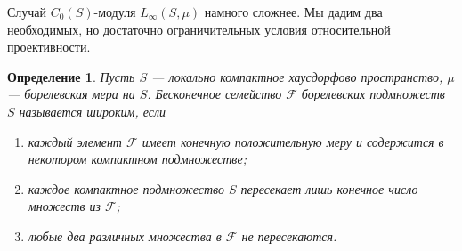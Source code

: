 \documentclass[12pt]{article}
\numberwithin{equation}{subsection}
\theoremstyle{plain}
\newtheorem{definition}{Определение}
\begin{document}
\begin{fulltext}
    Случай $C_0(S)$-модуля $L_\infty(S,\mu)$ намного сложнее. Мы дадим два
    необходимых, но достаточно ограничительных условия относительной
    проективности.

    \begin{definition}\label{WideFamilyDef} Пусть $S$ --- локально компактное
        хаусдорфово пространство, $\mu$ --- борелевская мера на $S$. Бесконечное
        семейство $\mathcal{F}$ борелевских подмножеств $S$ называется широким, 
        если

        \begin{enumerate}[label = (\roman*)]
            \item каждый элемент $\mathcal{F}$ имеет конечную положительную меру
                  и содержится в некотором компактном подмножестве;

            \item каждое компактное подмножество $S$ пересекает лишь конечное
                  число множеств из $\mathcal{F}$;

            \item любые два различных множества в $\mathcal{F}$ не пересекаются.
        \end{enumerate}
    \end{definition}


\end{fulltext}
\end{document}
